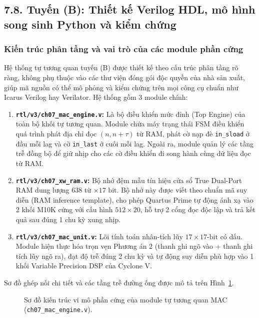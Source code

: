 \subsection*{7.8. Tuyến (B): Thiết kế Verilog HDL, mô hình song sinh Python và kiểm chứng}

\subsubsection*{Kiến trúc phân tầng và vai trò của các module phần cứng}
Hệ thống tự tương quan tuyến (B) được thiết kế theo cấu trúc phân tầng rõ ràng, không phụ thuộc vào các thư viện đóng gói độc quyền của nhà sản xuất, giúp mã nguồn có thể mô phỏng và kiểm chứng trên mọi công cụ chuẩn như Icarus Verilog hay Verilator. Hệ thống gồm 3 module chính:
\begin{enumerate}[leftmargin=1.5em, itemsep=3pt]
    \item \textbf{\texttt{rtl/v3/ch07\_mac\_engine.v}:}
    Là bộ điều khiển mức đỉnh (Top Engine) của toàn bộ khối tự tương quan. Module chứa máy trạng thái FSM điều khiển quá trình phát địa chỉ đọc $(n, n+\tau)$ từ RAM, phát cờ nạp đè \texttt{in\_sload} ở đầu mỗi lag và cờ \texttt{in\_last} ở cuối mỗi lag. Ngoài ra, module quản lý các tầng trễ đồng bộ để giữ nhịp cho các cờ điều khiển đi song hành cùng dữ liệu đọc từ RAM.
    
    \item \textbf{\texttt{rtl/v3/ch07\_xw\_ram.v}:}
    Bộ nhớ đệm mẫu tín hiệu cửa sổ True Dual-Port RAM dung lượng 638 từ $\times 17\text{ bit}$. Bộ nhớ này được viết theo chuẩn mã suy diễn (RAM inference template), cho phép Quartus Prime tự động ánh xạ vào 2 khối M10K cứng với cấu hình $512 \times 20$, hỗ trợ 2 cổng đọc độc lập và trả kết quả sau đúng 1 chu kỳ xung nhịp.
    
    \item \textbf{\texttt{rtl/v3/ch07\_mac\_unit.v}:}
    Lõi tính toán nhân-tích lũy $17 \times 17\text{-bit}$ có dấu. Module hiện thực hóa trọn vẹn Phương án 2 (thanh ghi ngõ vào + thanh ghi tích lũy ngõ ra), đạt độ trễ đúng 2 chu kỳ và tự động suy diễn phù hợp vào 1 khối Variable Precision DSP của Cyclone V.
\end{enumerate}

Sơ đồ ghép nối chi tiết và các tầng trễ đường ống được mô tả trên Hình~\ref{fig:ch07_mac_arch}.

\begin{figure}[htbp]
    \centering
    
    \caption{Sơ đồ kiến trúc vi mô phần cứng của module tự tương quan MAC (\texttt{ch07\_mac\_engine.v}).}
    \label{fig:ch07_mac_arch}
\end{figure}

